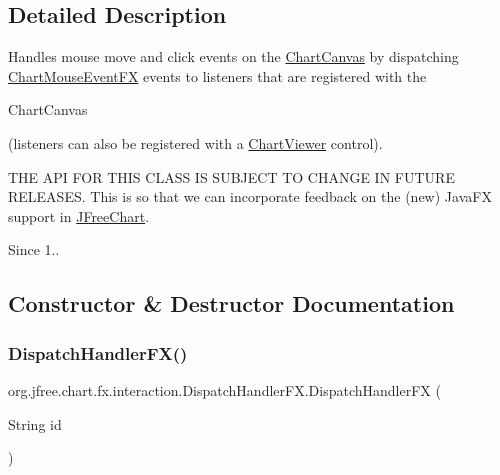\subsection{Detailed Description}
Handles mouse move and click events on the \mbox{\hyperlink{classorg_1_1jfree_1_1chart_1_1fx_1_1_chart_canvas}{Chart\+Canvas}} by dispatching \mbox{\hyperlink{classorg_1_1jfree_1_1chart_1_1fx_1_1interaction_1_1_chart_mouse_event_f_x}{Chart\+Mouse\+Event\+FX}} events to listeners that are registered with the
\begin{DoxyCode}
ChartCanvas 
\end{DoxyCode}
 (listeners can also be registered with a \mbox{\hyperlink{classorg_1_1jfree_1_1chart_1_1fx_1_1_chart_viewer}{Chart\+Viewer}} control).

T\+HE A\+PI F\+OR T\+H\+IS C\+L\+A\+SS IS S\+U\+B\+J\+E\+CT TO C\+H\+A\+N\+GE IN F\+U\+T\+U\+RE R\+E\+L\+E\+A\+S\+ES. This is so that we can incorporate feedback on the (new) Java\+FX support in \mbox{\hyperlink{classorg_1_1jfree_1_1chart_1_1_j_free_chart}{J\+Free\+Chart}}.

\begin{DoxySince}{Since}
1.. 
\end{DoxySince}


\subsection{Constructor \& Destructor Documentation}
\mbox{\label{classorg_1_1jfree_1_1chart_1_1fx_1_1interaction_1_1_dispatch_handler_f_x_aae3dcdf4f90e2f10823fe5f23b654ded}} 
\subsubsection{\texorpdfstring{Dispatch\+Handler\+F\+X()}{DispatchHandlerFX()}}
{\footnotesize\ttfamily org.\+jfree.\+chart.\+fx.\+interaction.\+Dispatch\+Handler\+F\+X.\+Dispatch\+Handler\+FX (\begin{DoxyParamCaption}\item[{String}]{id }\end{DoxyParamCaption})}

